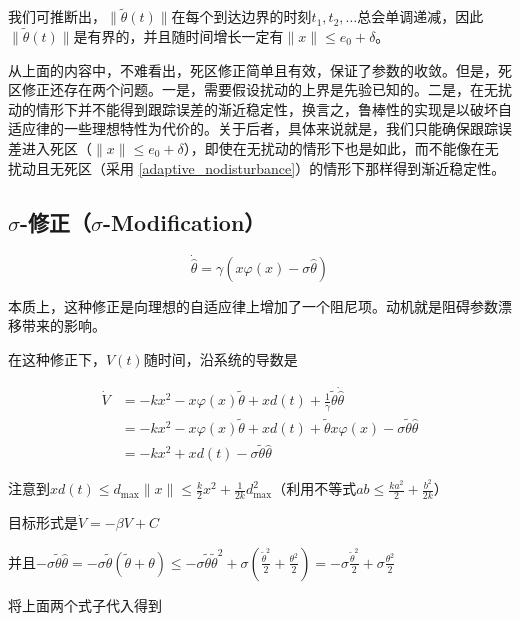 我们可推断出，\(\| \tilde{\theta}(t) \|\)在每个到达边界的时刻\(t_{1},t_{2},\ldots\)总会单调递减，因此\(\| \tilde{\theta}(t) \|\)是有界的，并且随时间增长一定有\(\| x \| \leq e_{0} + \delta\)。

从上面的内容中，不难看出，死区修正简单且有效，保证了参数的收敛。但是，死区修正还存在两个问题。一是，需要假设扰动的上界是先验已知的。二是，在无扰动的情形下并不能得到跟踪误差的渐近稳定性，换言之，鲁棒性的实现是以破坏自适应律的一些理想特性为代价的。关于后者，具体来说就是，我们只能确保跟踪误差进入死区（$\| x \| \leq e_0 + \delta$），即使在无扰动的情形下也是如此，而不能像在无扰动且无死区（采用 \eqref{adaptive_nodisturbance}）的情形下那样得到渐近稳定性。

\subsection{\texorpdfstring{$\sigma$-修正（$\sigma$-Modification）}{σ-修正（σ-Modification）}}

\begin{equation} \label{sigma_modification}
    \dot{\hat{\theta}} = \gamma(x\varphi(x) - \sigma\hat{\theta})
\end{equation}

本质上，这种修正是向理想的自适应律上增加了一个阻尼项。动机就是阻碍参数漂移带来的影响。

在这种修正下，\(V(t)\)随时间，沿系统的导数是

\[\begin{aligned}
\dot{V} & = - kx^{2} - x\varphi(x)\tilde{\theta} + xd(t) + \frac{1}{\gamma}\tilde{\theta}\dot{\hat{\theta}} \\
 & = - kx^{2} - x\varphi(x)\tilde{\theta} + xd(t) + \tilde{\theta}x\varphi(x) - \sigma\tilde{\theta}\hat{\theta} \\
 & = - kx^{2} + xd(t) - \sigma\tilde{\theta}\hat{\theta} 
\end{aligned}\]

注意到\(xd(t) \leq d_{\max} \| x \| \leq \frac{k}{2}x^{2} + \frac{1}{2k}d_{\max}^{2}\)（利用不等式\(ab \leq \frac{ka^{2}}{2} + \frac{b^{2}}{2k}\)）

目标形式是\(\dot{V} = - \beta V + C\)

并且\(- \sigma\tilde{\theta}\hat{\theta} = - \sigma\tilde{\theta}(\tilde{\theta} + \theta) \leq - \sigma\tilde{\theta}{\tilde{\theta}}^{2} + \sigma(\frac{{\tilde{\theta}}^{2}}{2} + \frac{\theta^{2}}{2}) = - \sigma\frac{{\tilde{\theta}}^{2}}{2} + \sigma\frac{\theta^{2}}{2}\)

将上面两个式子代入得到

